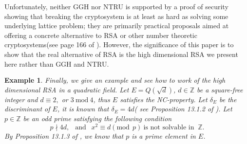 \documentclass [11pt]{article}
\newtheorem{example}[thm]{\bf{Example}}
\begin{document}
Unfortunately, neither GGH nor NTRU is supported by a proof of security showing that breaking the cryptosystem is at least as hard as solving
some underlying lattice problem; they are primarily  practical proposals aimed at offering a concrete alternative to RSA or other number theoretic cryptosystems(see page 166 of \cite{M2}). However, the significance of this paper is to show that the real alternative of RSA   
is the high dimensional RSA we present here rather than GGH and NTRU.
\begin{example}
 Finally, we give an example and see how to work of the high dimensional RSA in a quadratic field. Let $E=Q(\sqrt{d})$,  $d \in \mathbb{Z}$ be a square-free integer and $d\equiv 2,$  or $3 \  \mathrm{mod} \ 4$, thus  $E$ satisfies the NC-property. Let $\delta_{E}$ be the discriminant of $E$, it is known that $\delta_{E}=4 d$( see Proposition 13.1.2 of \cite{I}). Let  $p \in \mathbb{Z}$ be an odd prime satisfying  the following condition
 \begin{equation}\label{4.1}
p \nmid 4d,\ \ \text{ and }\ \ x^{2}\equiv d(\text{mod}\ \  p) \  \text{is not solvable in }\ \mathbb{Z}.
\end{equation}
By Proposition 13.1.3 of \cite{I}, we know that $p$ is a prime element in $E$.


\end{example}
\end{document}
